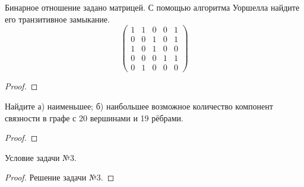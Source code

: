 
\renewcommand*{\proofname}{Решение}

\begin{problem}
	Бинарное отношение задано матрицей. С помощью алгоритма Уоршелла найдите его транзитивное замыкание.
	$$ \left( \begin{array}{ccccc}
		1 &1 &0 &0 &1 \\0 &0 &1 &0 &1 \\1 &0 &1 &0 &0 \\0 &0 &0 &1 &1 \\0 &1 &0 &0 &0\end{array} \right) $$
\end{problem}

\begin{proof}

\end{proof}

\begin{problem}
	Найдите а) наименьшее; б) наибольшее возможное количество компонент связности в графе с 20 вершинами и 
	19 рёбрами.
\end{problem}

\begin{proof}

\end{proof}

\begin{problem}
	Условие задачи №3.
\end{problem}

\begin{proof}
	Решение задачи №3.
\end{proof}